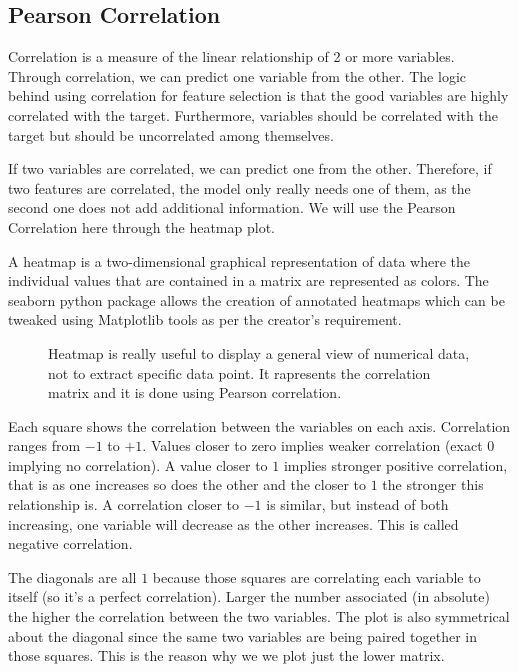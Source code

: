 \subsection{Pearson Correlation}
\label{sec:pearsoncorr}
Correlation is a measure of the linear relationship of 2 or more variables. Through correlation, we can predict one variable from the other. The logic behind using correlation for feature selection is that the good variables are highly correlated with the target. Furthermore, variables should be correlated with the target but should be uncorrelated among themselves.

\noindent If two variables are correlated, we can predict one from the other. Therefore, if two features are correlated, the model only really needs one of them, as the second one does not add additional information. We will use the Pearson Correlation here through the heatmap plot.

\noindent A heatmap is a two-dimensional graphical representation of data where the individual values that are contained in a matrix are represented as colors. The seaborn python package allows the creation of annotated heatmaps which can be tweaked using Matplotlib tools as per the creator’s requirement.

\begin{figure}[H]
	\caption[Heatmap.]{Heatmap is really useful to display a general view of numerical data, not to extract specific data point. It rapresents the correlation matrix and it is done using Pearson correlation.}\label{fig:correlation}
\end{figure}

\noindent Each square shows the correlation between the variables on each axis. Correlation ranges from $-1$ to $+1$. Values closer to zero implies weaker correlation (exact $0$ implying no correlation). A value closer to $1$ implies stronger positive correlation, that is as one increases so does the other and the closer to $1$ the stronger this relationship is. A correlation closer to $-1$ is similar, but instead of both increasing, one variable will decrease as the other increases. This is called negative correlation.

\noindent The diagonals are all $1$ because those squares are correlating each variable to itself (so it's a perfect correlation). Larger the number associated (in absolute) the higher the correlation between the two variables. The plot is also symmetrical about the diagonal since the same two variables are being paired together in those squares. This is the reason why we we plot just the lower matrix.

